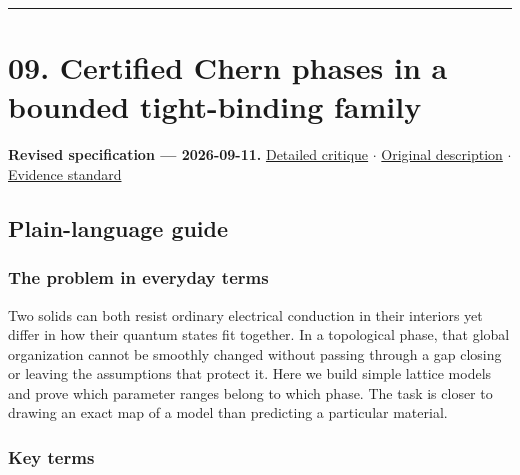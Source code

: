 \documentclass[
  11pt,
]{article}
\begin{document}
\begin{center}\rule{0.5\linewidth}{0.5pt}\end{center}

\section{09. Certified Chern phases in a bounded tight-binding family}

\textbf{Revised specification --- 2026-09-11.}
\href{https://github.com/rick-stevens-ai/Pure-Thought/blob/main/reviews/09-Topological-Band-Theory.md}{Detailed
critique} \ensuremath{\cdot}
\href{https://github.com/rick-stevens-ai/Pure-Thought/blob/main/archive/original-PRDs/09-Topological-Band-Theory.md}{Original
description} \ensuremath{\cdot}
\href{https://github.com/rick-stevens-ai/Pure-Thought/blob/main/reviews/EVIDENCE-STANDARD.md}{Evidence
standard}

\subsection{Plain-language guide}

\subsubsection{The problem in everyday terms}

Two solids can both resist ordinary electrical conduction in their
interiors yet differ in how their quantum states fit together. In a
topological phase, that global organization cannot be smoothly changed
without passing through a gap closing or leaving the assumptions that
protect it. Here we build simple lattice models and prove which
parameter ranges belong to which phase. The task is closer to drawing an
exact map of a model than predicting a particular material.

\subsubsection{Key terms}
\end{document}
